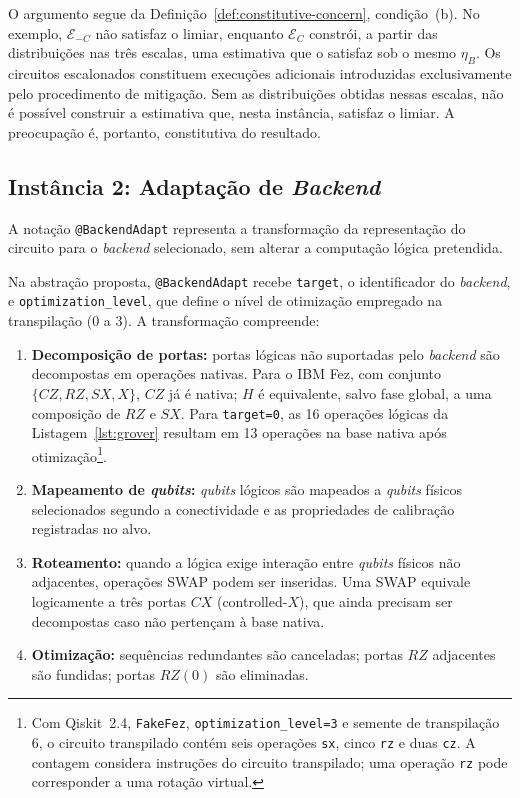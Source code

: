 \documentclass[sigconf]{acmart}
\begin{document}
O argumento segue da Definição~\ref{def:constitutive-concern}, condição~(b). No exemplo, $\mathcal{E}_{-C}$ não satisfaz o limiar, enquanto $\mathcal{E}_C$ constrói, a partir das distribuições nas três escalas, uma estimativa que o satisfaz sob o mesmo $\eta_B$. Os circuitos escalonados constituem execuções adicionais introduzidas exclusivamente pelo procedimento de mitigação. Sem as distribuições obtidas nessas escalas, não é possível construir a estimativa que, nesta instância, satisfaz o limiar. A preocupação é, portanto, constitutiva do resultado.

\subsection{Instância 2: Adaptação de \textit{Backend}}

A notação \texttt{@BackendAdapt} representa a transformação da representação do circuito para o \textit{backend} selecionado, sem alterar a computação lógica pretendida.

Na abstração proposta, \texttt{@BackendAdapt} recebe \texttt{target}, o identificador do \textit{backend}, e \texttt{optimization\_level}, que define o nível de otimização empregado na transpilação (0 a 3). A transformação compreende:

\begin{enumerate}
  \item \textbf{Decomposição de portas:} portas lógicas não suportadas pelo \textit{backend} são decompostas em operações nativas. Para o IBM Fez, com conjunto $\{CZ, RZ, SX, X\}$, $CZ$ já é nativa; $H$ é equivalente, salvo fase global, a uma composição de $RZ$ e $SX$. Para \texttt{target=0}, as 16 operações lógicas da Listagem~\ref{lst:grover} resultam em 13 operações na base nativa após otimização\footnote{Com Qiskit~2.4, \texttt{FakeFez}, \texttt{optimization\_level=3} e semente de transpilação 6, o circuito transpilado contém seis operações \texttt{sx}, cinco \texttt{rz} e duas \texttt{cz}. A contagem considera instruções do circuito transpilado; uma operação \texttt{rz} pode corresponder a uma rotação virtual.}.
  \item \textbf{Mapeamento de \textit{qubits}:} \textit{qubits} lógicos são mapeados a \textit{qubits} físicos selecionados segundo a conectividade e as propriedades de calibração registradas no alvo.
  \item \textbf{Roteamento:} quando a lógica exige interação entre \textit{qubits} físicos não adjacentes, operações SWAP podem ser inseridas. Uma SWAP equivale logicamente a três portas $CX$ (controlled-$X$), que ainda precisam ser decompostas caso não pertençam à base nativa.
  \item \textbf{Otimização:} sequências redundantes são canceladas; portas $RZ$ adjacentes são fundidas; portas $RZ(0)$ são eliminadas.
\end{enumerate}
\end{document}
